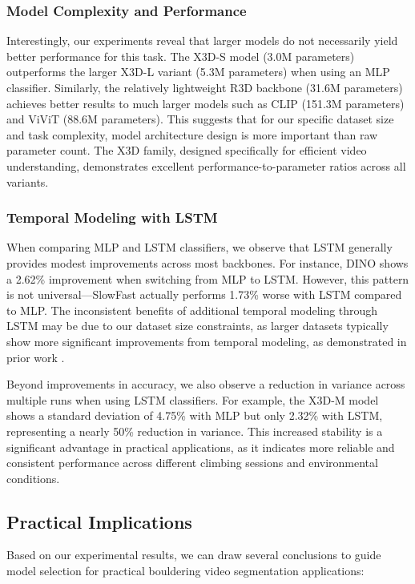 \subsubsection{Model Complexity and Performance}
Interestingly, our experiments reveal that larger models do not necessarily yield better performance for this task. The X3D-S model (3.0M parameters) outperforms the larger X3D-L variant (5.3M parameters) when using an MLP classifier. Similarly, the relatively lightweight R3D backbone (31.6M parameters) achieves better results to much larger models such as CLIP (151.3M parameters) and ViViT (88.6M parameters). This suggests that for our specific dataset size and task complexity, model architecture design is more important than raw parameter count. The X3D family, designed specifically for efficient video understanding, demonstrates excellent performance-to-parameter ratios across all variants.

\subsubsection{Temporal Modeling with LSTM}
When comparing MLP and LSTM classifiers, we observe that LSTM generally provides modest improvements across most backbones. For instance, DINO shows a 2.62\% improvement when switching from MLP to LSTM. However, this pattern is not universal—SlowFast actually performs 1.73\% worse with LSTM compared to MLP. The inconsistent benefits of additional temporal modeling through LSTM may be due to our dataset size constraints, as larger datasets typically show more significant improvements from temporal modeling, as demonstrated in prior work \cite{action-clip}.

Beyond improvements in accuracy, we also observe a reduction in variance across multiple runs when using LSTM classifiers. For example, the X3D-M model shows a standard deviation of 4.75\% with MLP but only 2.32\% with LSTM, representing a nearly 50\% reduction in variance. This increased stability is a significant advantage in practical applications, as it indicates more reliable and consistent performance across different climbing sessions and environmental conditions.

\subsection{Practical Implications}
Based on our experimental results, we can draw several conclusions to guide model selection for practical bouldering video segmentation applications:

